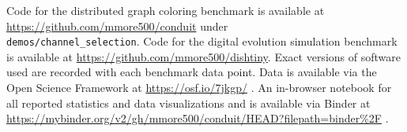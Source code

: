Code for the distributed graph coloring benchmark is available at \url{https://github.com/mmore500/conduit} under \\ \texttt{demos/channel\_selection}.
Code for the digital evolution simulation benchmark is available at \url{https://github.com/mmore500/dishtiny}.
Exact versions of software used are recorded with each benchmark data point.
Data is available via the Open Science Framework at \url{https://osf.io/7jkgp/} \cite{foster2017open}.
An in-browser notebook for all reported statistics and data visualizations and is available via Binder at \url{https://mybinder.org/v2/gh/mmore500/conduit/HEAD?filepath=binder\%2F} \cite{jupyter2018binder}.
